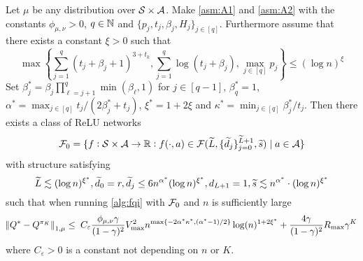 \begin{thm} \label{thm:main}
    Let $\mu$ be any distribution over $\mathcal{S} \times \mathcal{A}$.
  Make \cref{asm:A1} and \cref{asm:A2} with the
  constants $\phi_{\mu, \nu} > 0$, $q \in \mathbb{N}$ and
  $\{p_j, t_j, \beta_j, H_j\}_{j \in [q]}$. Furthermore assume
  that there exists a constant $\xi > 0$ such that
  \[ \max \left\{ \sum_{j=1}^q (t_j + \beta_j + 1)^{3 + t_k},
      \sum_{j=1}^q \log (t_j + \beta_j),
      \max_{j \in [q]} p_j
  \right\} \leq (\log n)^\xi \] 
  Set $\beta^*_j = \beta_j \prod_{\ell = j+1}^q \min(\beta_\ell, 1)$
  for $j\in [q-1]$, $\beta^*_q = 1$,
  $\alpha^* = \max_{j \in [q]} t_j/(2\beta^*_j + t_j)$, 
  $\xi^* = 1 + 2\xi$ and $\kappa^* = \min_{j\in [q]} \beta^*_j/t_j$.
  Then there exists a class of ReLU networks
  \[ \mathcal{F}_0 = \{f : \mathcal{S} \times \mathcal{A} \to \mathbb{R} : f(\cdot, a) \in 
  \mathcal{F}(\widetilde{L}, \{\widetilde{d}_j\}_{j=0}^{\widetilde{L}+1},\widetilde{s}) \mid a \in \mathcal{A} \} \]
  with structure satisfying
  \[ \widetilde{L} \lesssim (\log n)^{\xi^*},
    \widetilde{d}_0 = r, \widetilde{d}_j \leq 6 n^{\alpha^*} (\log n)^{\xi^*},
  d_{L+1} = 1, \widetilde{s} \lesssim n^{\alpha^*} \cdot (\log n)^{\xi^*} \]
  such that when running \cref{alg:fqi} with $\mathcal{F}_0$
  and $n$ is sufficiently large
  \[ \norm{Q^* - Q^{\pi_K}}_{1, \mu} \leq \;
    C_{\varepsilon} \frac{\phi_{\mu, \nu} \gamma}{(1-\gamma)^2} V_{\max}^2
    n^{\max\{-2\alpha^*\kappa^*, (\alpha^*  - 1)/2 \}} \log(n)^{1+2\xi^*}
    + \frac{4 \gamma}{(1-\gamma)^2} R_{\max} \gamma^K
  \]
  where $C_{\varepsilon}>0$ is a constant not depending on $n$ or $K$.
\end{thm}


